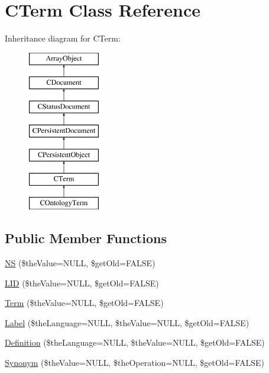 \hypertarget{class_c_term}{\section{C\-Term Class Reference}
\label{class_c_term}
}
Inheritance diagram for C\-Term\-:\begin{figure}[H]
\begin{center}
\leavevmode
\includegraphics[height=7.000000cm]{class_c_term}
\end{center}
\end{figure}
\subsection*{Public Member Functions}
\begin{DoxyCompactItemize}
\item 
\hyperlink{class_c_term_a59a271c34a9f579bcf3177b392b6e31a}{N\-S} (\$the\-Value=N\-U\-L\-L, \$get\-Old=F\-A\-L\-S\-E)
\item 
\hyperlink{class_c_term_ae9a44c9e2b44ab35e28b6215a92ad0bf}{L\-I\-D} (\$the\-Value=N\-U\-L\-L, \$get\-Old=F\-A\-L\-S\-E)
\item 
\hyperlink{class_c_term_a4a8599bf7001354a6b4be80c73c11c9d}{Term} (\$the\-Value=N\-U\-L\-L, \$get\-Old=F\-A\-L\-S\-E)
\item 
\hyperlink{class_c_term_a6d832ed436e71f3c78411bd767dae182}{Label} (\$the\-Language=N\-U\-L\-L, \$the\-Value=N\-U\-L\-L, \$get\-Old=F\-A\-L\-S\-E)
\item 
\hyperlink{class_c_term_aa35db271304b2e8683ab1973c31d896f}{Definition} (\$the\-Language=N\-U\-L\-L, \$the\-Value=N\-U\-L\-L, \$get\-Old=F\-A\-L\-S\-E)
\item 
\hyperlink{class_c_term_acd2807647fc5af82bbcb02c797fde523}{Synonym} (\$the\-Value=N\-U\-L\-L, \$the\-Operation=N\-U\-L\-L, \$get\-Old=F\-A\-L\-S\-E)
\end{DoxyCompactItemize}
